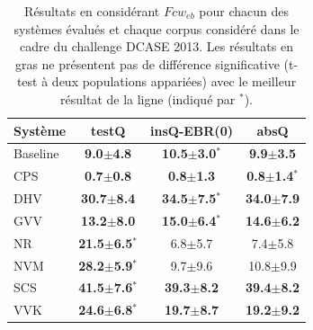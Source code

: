 \begin{table} 
\begin{center}  
\begin{tabular}{lccc}  
Système  & testQ & insQ-EBR(0) & absQ \\ 
\hline 
Baseline & \textbf{ 9.0$\pm$4.8}     & \textbf{10.5$\pm$3.0$^*$}   & \textbf{ 9.9$\pm$3.5} \\ 
CPS      & \textbf{0.7$\pm$0.8}      & \textbf{0.8$\pm$1.3}        & \textbf{0.8$\pm$1.4$^*$} \\ 
DHV      & \textbf{30.7$\pm$8.4}     & \textbf{34.5$\pm$7.5$^*$}   & \textbf{34.0$\pm$7.9} \\ 
GVV      & \textbf{13.2$\pm$8.0}     & \textbf{15.0$\pm$6.4$^*$}   & \textbf{14.6$\pm$6.2} \\ 
NR       & \textbf{21.5$\pm$6.5$^*$} &  6.8$\pm$5.7                &  7.4$\pm$5.8 \\ 
NVM      & \textbf{28.2$\pm$5.9$^*$} &  9.7$\pm$9.6                & 10.8$\pm$9.9 \\ 
SCS      & \textbf{41.5$\pm$7.6$^*$} & \textbf{39.3$\pm$8.2}       & \textbf{39.4$\pm$8.2} \\ 
VVK      & \textbf{24.6$\pm$6.8$^*$} & \textbf{19.7$\pm$8.7}       & \textbf{19.2$\pm$9.2} \\  
\hline
\end{tabular} 
\end{center} 
\caption[Résultats en considérant $Fcw_{eb}$ pour chacun des systèmes évalués et chaque corpus considéré dans le cadre du challenge DCASE 2013]{Résultats en considérant $Fcw_{eb}$ pour chacun des systèmes évalués et chaque corpus considéré dans le cadre du challenge DCASE 2013. Les résultats en gras ne présentent pas de différence significative (t-test à deux populations appariées) avec le meilleur résultat de la ligne (indiqué par $^*$).} 
\label{tab:qmul} 
\end{table} 


